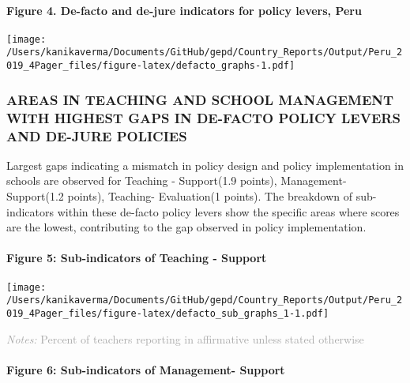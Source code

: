 \documentclass[twocolumn]{article}
\let\oldparagraph\paragraph
\renewcommand{\paragraph}[1]{\oldparagraph{#1}\mbox{}}
\begin{document}
\hypertarget{figure-4.-de-facto-and-de-jure-indicators-for-policy-levers-peru}{%
\paragraph{Figure 4. De-facto and de-jure indicators for policy levers,
Peru}\label{figure-4.-de-facto-and-de-jure-indicators-for-policy-levers-peru}}

\texttt{[image: /Users/kanikaverma/Documents/GitHub/gepd/Country\_Reports/Output/Peru\_2019\_4Pager\_files/figure-latex/defacto\_graphs-1.pdf]}

\hypertarget{areas-in-teaching-and-school-management-with-highest-gaps-in-de-facto-policy-levers-and-de-jure-policies}{%
\subsubsection{\texorpdfstring{\textbf{AREAS IN TEACHING AND SCHOOL
MANAGEMENT WITH HIGHEST GAPS IN DE-FACTO POLICY LEVERS AND DE-JURE
POLICIES}}{AREAS IN TEACHING AND SCHOOL MANAGEMENT WITH HIGHEST GAPS IN DE-FACTO POLICY LEVERS AND DE-JURE POLICIES}}\label{areas-in-teaching-and-school-management-with-highest-gaps-in-de-facto-policy-levers-and-de-jure-policies}}

Largest gaps indicating a mismatch in policy design and policy
implementation in schools are observed for Teaching - Support(1.9
points), Management- Support(1.2 points), Teaching- Evaluation(1
points). The breakdown of sub-indicators within these de-facto policy
levers show the specific areas where scores are the lowest, contributing
to the gap observed in policy implementation. \vfill\null

\hypertarget{figure-5-sub-indicators-of-teaching---support}{%
\paragraph{Figure 5: Sub-indicators of Teaching -
Support}\label{figure-5-sub-indicators-of-teaching---support}}

\texttt{[image: /Users/kanikaverma/Documents/GitHub/gepd/Country\_Reports/Output/Peru\_2019\_4Pager\_files/figure-latex/defacto\_sub\_graphs\_1-1.pdf]}

{\scriptsize
    \textcolor{darkgray}{\textit{Notes:} Percent of teachers reporting in affirmative unless stated otherwise}
  }

\hypertarget{figure-6-sub-indicators-of-management--support}{%
\paragraph{Figure 6: Sub-indicators of Management-
Support}\label{figure-6-sub-indicators-of-management--support}}
\end{document}
